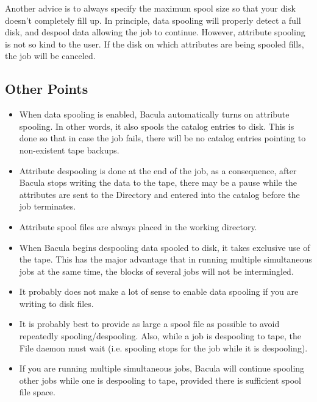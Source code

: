 Another advice is to always specify the maximum spool size so that your disk
doesn't completely fill up. In principle, data spooling will properly detect a
full disk, and despool data allowing the job to continue. However, attribute
spooling is not so kind to the user. If the disk on which attributes are being
spooled fills, the job will be canceled. 
\label{points}

\subsection*{Other Points}

\begin{itemize}
\item When data spooling is enabled, Bacula automatically  turns on attribute
   spooling. In other words, it also  spools the catalog entries to disk. This is
   done so  that in case the job fails, there will be no catalog  entries
pointing to non-existent tape backups. 
\item Attribute despooling is done at the end of the job, as  a consequence,
   after Bacula stops writing the data to  the tape, there may be a pause while
   the attributes are sent  to the Directory and entered into the catalog before 
the job terminates. 
\item Attribute spool files are always placed in the  working directory. 
\item When Bacula begins despooling data spooled to disk, it  takes exclusive
   use of the tape. This has the major  advantage that in running multiple
   simultaneous jobs at  the same time, the blocks of several jobs will not be 
intermingled. 
\item It probably does not make a lot of sense to enable data  spooling if you
   are writing to disk files. 
\item It is probably best to provide as large a spool file as  possible to
   avoid repeatedly spooling/despooling. Also,  while a job is despooling to
   tape, the File daemon must wait  (i.e. spooling stops for the job while it is 
despooling).  
\item If you are running multiple simultaneous jobs, Bacula  will continue
   spooling other jobs while one is despooling  to tape, provided there is
   sufficient spool file space. 
\end{itemize}
